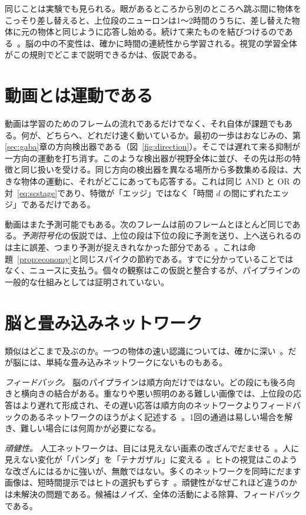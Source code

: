 同じことは実験でも見られる。眼があるところから別のところへ跳ぶ間に物体をこっそり差し替えると、上位段のニューロンは1〜2時間のうちに、差し替えた物体に元の物体と同じように応答し始める。続けて来たものを結びつけるのである~\cite{LiDiCarlo2008}。脳の中の不変性は、確かに時間の連続性から学習される。視覚の学習全体がこの規則でどこまで説明できるかは、仮説である。

\section{動画とは運動である}

動画は学習のためのフレームの流れであるだけでなく、それ自体が課題でもある。何が、どちらへ、どれだけ速く動いているか。最初の一歩はおなじみの、第\ref{sec:gaba}章の方向検出器である（図~\ref{fig:direction}）。そこでは遅れて来る抑制が一方向の運動を打ち消す。このような検出器が視野全体に並び、その先は形の特徴と同じ扱いを受ける。同じ方向の検出器を異なる場所から多数集める段は、大きな物体の運動に、それがどこにあっても応答する。これは同じ AND と OR の対~\eqref{eq:scstage}であり、特徴が「エッジ」ではなく「時間 $d$ の間にずれたエッジ」であるだけである。

動画はまた予測可能でもある。次のフレームは前のフレームとほとんど同じである。\emph{予測符号化}の仮説では、上位の段は下位の段に予測を送り、上へ送られるのは主に誤差、つまり予測が捉えきれなかった部分である~\cite{RaoBallard1999}。これは命題~\ref{prop:economy}と同じスパイクの節約である。すでに分かっていることではなく、ニュースに支払う。個々の観察はこの仮説と整合するが、パイプラインの一般的な仕組みとしては証明されていない。

\section{脳と畳み込みネットワーク}

類似はどこまで及ぶのか。一つの物体の速い認識については、確かに深い~\cite{Yamins2014}。だが脳には、単純な畳み込みネットワークにないものもある。

\emph{フィードバック。} 脳のパイプラインは順方向だけではない。どの段にも後ろ向きと横向きの結合がある。重なりや悪い照明のある難しい画像では、上位段の応答はより遅れて形成され、その遅い応答は順方向のネットワークよりフィードバックのあるネットワークのほうがよく記述する~\cite{Kar2019}。1回の通過は易しい場合を解き、難しい場合には何周かが必要になる。

\emph{頑健性。} 人工ネットワークは、目には見えない画素の改ざんでだませる~\cite{Szegedy2014}。人に見えない変化が「パンダ」を「テナガザル」に変える~\cite{Goodfellow2015}。ヒトの視覚はこのような改ざんにはるかに強いが、無敵ではない。多くのネットワークを同時にだます画像は、短時間提示ではヒトの選択もずらす~\cite{Elsayed2018}。頑健性がなぜこれほど違うのかは未解決の問題である。候補はノイズ、全体の活動による除算、フィードバックである。

